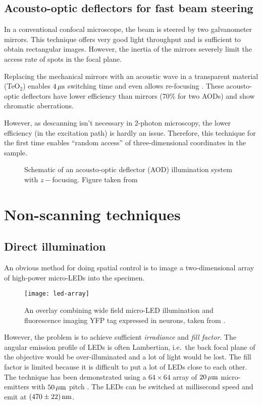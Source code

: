 \subsection{Acousto-optic deflectors for fast beam steering}
In a conventional confocal microscope, the beam is steered by two
galvanometer mirrors. This technique offers very good light throughput
and is sufficient to obtain rectangular images. However, the inertia
of the mirrors severely limit the access rate of spots in the focal
plane.

Replacing the mechanical mirrors with an acoustic wave in a
transparent material (TeO$_2$) enables $\unit[4]{\mu s}$ switching
time \citep{Otsu2008} and even allows re-focusing
\citep{Reddy2008}. These acousto-optic deflectors have lower
efficiency than mirrors (70\% for two AODs) and show chromatic
aberrations.

However, as descanning isn't necessary in 2-photon microscopy, the
lower efficiency (in the excitation path) is hardly an
issue. Therefore, this technique for the first time enables ``random
access'' of three-dimensional coordinates in the sample.

\begin{figure}[!hbt]
  \centering
  \caption{Schematic of an acousto-optic deflector (AOD) illumination
    system with $z-$focusing. Figure taken from \citet{Reddy2008}}
  \label{fig:aod}
\end{figure}


\section{Non-scanning techniques}
\subsection{Direct illumination}
An obvious method for doing spatial control is to image a
two-dimensional array of high-power micro-LEDs into the specimen.
\begin{figure}[!hbt]
  \centering
  \texttt{[image: led-array]} 
  \caption{An overlay combining wide field micro-LED illumination and
    fluorescence imaging YFP tag expressed in neurons, taken from
    \citet{grossman2010}.}
  \label{fig:led-array}
\end{figure}
However, the problem is to achieve sufficient \emph{irradiance} and
\emph{fill factor}. The angular emission profile of LEDs is often
Lambertian, i.e.\ the back focal plane of the objective would be
over-illuminated and a lot of light would be lost. The fill factor is
limited because it is difficult to put a lot of LEDs close to each
other.  The technique has been demonstrated using a $64\times64$ array
of $\unit[20]{\mu m}$ micro-emitters with $\unit[50]{\mu m}$ pitch
\citep{grossman2010}.  The LEDs can be switched at millisecond speed
and emit at $\unit[(470\pm22)]{nm}$.

